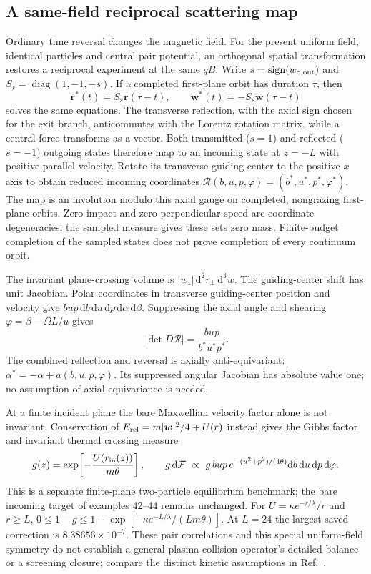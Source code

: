 \documentclass[11pt,letterpaper]{article}
\newcommand{\dd}{\mathrm d}
\newcommand{\diag}{\operatorname{diag}}
\begin{document}
\subsection*{A same-field reciprocal scattering map}
Ordinary time reversal changes the magnetic field. For the present
uniform field, identical particles and central pair potential, an orthogonal
spatial transformation restores a reciprocal experiment at the same $qB$. Write
$s=\operatorname{sign}(w_{z,\rm out})$ and
$S_s=\diag(1,-1,-s)$. If a completed first-plane orbit has duration $\tau$,
then
\[
 \bm r^*(t)=S_s\bm r(\tau-t),\qquad
 \bm w^*(t)=-S_s\bm w(\tau-t)
\]
solves the same equations. The transverse reflection, with the axial sign
chosen for the exit branch, anticommutes with
the Lorentz rotation matrix, while a central force transforms as a
vector. Both transmitted ($s=1$) and reflected ($s=-1$) outgoing states
therefore map to an incoming state at $z=-L$ with positive parallel
velocity. Rotate its transverse guiding center to the positive $x$ axis
to obtain reduced incoming coordinates
$\mathcal R(b,u,p,\varphi)=(b^*,u^*,p^*,\varphi^*)$.
The map is an involution modulo this axial gauge on completed,
nongrazing first-plane orbits. Zero impact and zero perpendicular speed
are coordinate degeneracies; the sampled measure gives these sets zero
mass. Finite-budget completion of the sampled states does not prove
completion of every continuum orbit.

The invariant plane-crossing volume is
$|w_z|\,\dd^2r_\perp\,\dd^3w$. The guiding-center shift has unit
Jacobian. Polar coordinates in transverse guiding-center position and
velocity give $bup\,\dd b\,\dd u\,\dd p\,\dd\alpha\,\dd\beta$.
Suppressing the axial angle and shearing
$\varphi=\beta-\Omega L/u$ gives
\[
 |\det D\mathcal R|=\frac{bup}{b^*u^*p^*}.
\]
The combined reflection and reversal is axially anti-equivariant:
$\alpha^*=-\alpha+a(b,u,p,\varphi)$. Its suppressed angular Jacobian
has absolute value one; no assumption of axial equivariance is needed.

At a finite incident plane the bare Maxwellian velocity factor alone
is not invariant. Conservation of
$E_{\rm rel}=m|\bm w|^2/4+U(r)$ instead gives the Gibbs factor
and invariant thermal crossing measure
\[
 g(z)=\exp\!\left[-\frac{U(r_{\rm in}(z))}{m\theta}\right],\qquad
 g\,\dd\mathcal F\ \propto\
 g\,bup\,e^{-(u^2+p^2)/(4\theta)}
 \dd b\,\dd u\,\dd p\,\dd\varphi.
\]
This is a separate finite-plane two-particle equilibrium benchmark;
the bare incoming target of examples 42--44 remains unchanged.
For $U=\kappa e^{-r/\lambda}/r$ and $r\geq L$,
$0\leq1-g\leq1-\exp[-\kappa e^{-L/\lambda}/(Lm\theta)]$.
At $L=24$ the largest saved correction is $8.38656\times10^{-7}$.
These pair correlations and this special uniform-field symmetry do not
establish a general plasma collision operator's detailed balance or a
screening closure; compare the distinct kinetic assumptions in
Ref.~\cite{JB20}.
\end{document}
